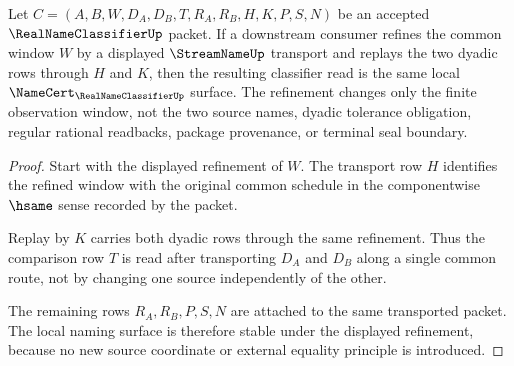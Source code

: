 \begin{theorem}
\label{thm:real-name-classifier-refinement-stability}
Let $C=(A,B,W,D_A,D_B,T,R_A,R_B,H,K,P,S,N)$ be an accepted $\RealNameClassifierUp$ packet. If a downstream consumer refines the common window $W$ by a displayed $\StreamNameUp$ transport and replays the two dyadic rows through $H$ and $K$, then the resulting classifier read is the same local $\NameCert_{\RealNameClassifierUp}$ surface. The refinement changes only the finite observation window, not the two source names, dyadic tolerance obligation, regular rational readbacks, package provenance, or terminal seal boundary.
\end{theorem}
\begin{proof}
Start with the displayed refinement of $W$. The transport row $H$ identifies the refined window with the original common schedule in the componentwise $\hsame$ sense recorded by the packet.

Replay by $K$ carries both dyadic rows through the same refinement. Thus the comparison row $T$ is read after transporting $D_A$ and $D_B$ along a single common route, not by changing one source independently of the other.

The remaining rows $R_A,R_B,P,S,N$ are attached to the same transported packet. The local naming surface is therefore stable under the displayed refinement, because no new source coordinate or external equality principle is introduced.
\end{proof}

